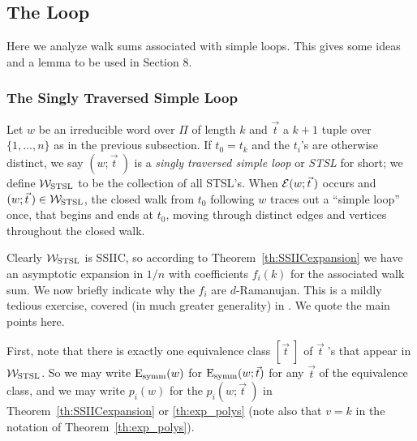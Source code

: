 \documentclass[12pt]{article}
\newcommand{\dtreelike}{{$d$-Ramanujan}}
\newcommand{\ce}{{\cal E}}
\newcommand{\cw}{{\cal W}}
\newcommand{\Esymm}{{\rm E}_{\rm symm}}
\newcommand{\intn}{{\{1,\ldots,n\}}}
\newcommand{\cestsl}{{\ce_{\rm STSL}}}
\newcommand{\cwstsl}{{\cw_{\rm STSL}}}
\newcommand{\pstsl}{{P_{\rm STSL}}}
\newcommand{\fstsl}{{f_{\rm STSL}}}
\begin{document}
\subsection{The Loop}

Here we analyze walk sums associated with simple loops.  This gives
some ideas and a lemma to be used in Section 8.

\subsubsection{The Singly Traversed Simple Loop}
\label{sb:stsl}
Let $w$ be an irreducible
word over $\Pi$ of length $k$ and $\vec t$ a $k+1$ tuple
over $\intn$ as in the previous subsection.
If $t_0=t_k$ and the $t_i$'s are otherwise
distinct, we say $(w;\vec t\>)$
is a {\em singly traversed simple loop}
or {\em STSL} for short; we define $\cwstsl$ to be the collection of all
STSL's.
When $\ce(w;\vec t\>)$ occurs and $(w;\vec t\>)\in\cwstsl$,
the closed walk
from $t_0$ following $w$ traces
out a ``simple loop'' once,
that begins and ends at $t_0$, moving through distinct edges
and vertices throughout the closed walk.

Clearly $\cwstsl$ is SSIIC, so according to Theorem~\ref{th:SSIICexpansion}
we have an asymptotic expansion in $1/n$ with coefficients $f_i(k)$
for the associated walk sum.  We now briefly indicate why the
$f_i$ are {\dtreelike}.  This is a mildly tedious
exercise, covered (in much greater generality)
in \cite{friedman_random_graphs}.  We quote the main points
here.

First, note that there is exactly one equivalence class $[\vec t\>]$
of $\vec t\;$'s that appear in $\cwstsl$.  So we may write $\Esymm(w)$
for $\Esymm(w;\vec t)$ for any $\vec t$ of the equivalence class, and
we may write $p_i(w)$ for the $p_i(w;\vec t\>)$ in
Theorem~\ref{th:SSIICexpansion} or \ref{th:exp_polys}
(note also that $v=k$ in the notation
of Theorem~\ref{th:exp_polys}).

\end{document}
